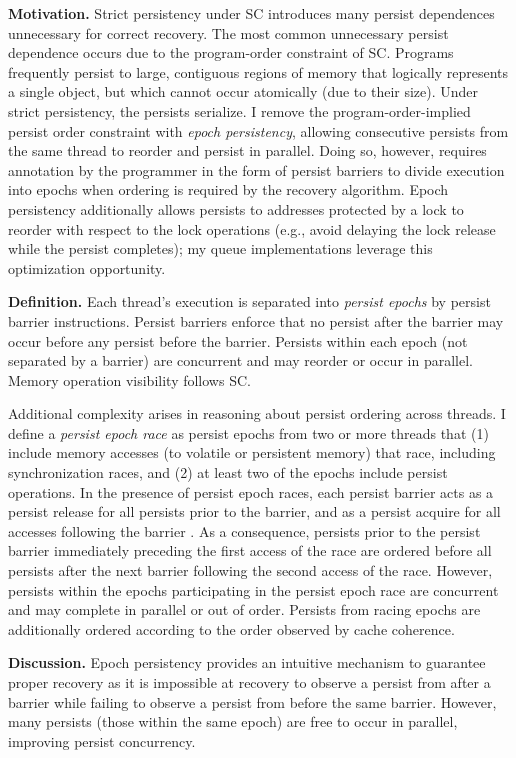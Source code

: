 \textbf{Motivation.}
Strict persistency under SC introduces many persist dependences unnecessary for correct recovery.
The most common unnecessary persist dependence occurs due to the program-order constraint of SC.
Programs frequently persist to large, contiguous regions of memory that logically represents a single object, but which cannot occur atomically (due to their size).
Under strict persistency, the persists serialize.
I remove the program-order-implied persist order constraint with \emph{epoch persistency}, allowing consecutive persists from the same thread to reorder and persist in parallel.
Doing so, however, requires annotation by the programmer in the form of persist barriers to divide execution into epochs when ordering is required by the recovery algorithm.
Epoch persistency additionally allows persists to addresses protected by a lock to reorder with respect to the lock operations (e.g., avoid delaying the lock release while the persist completes); my queue implementations leverage this optimization opportunity.

\textbf{Definition.}
Each thread's execution is separated into \emph{persist epochs} by persist barrier instructions.
Persist barriers enforce that no persist after the barrier may occur before any persist before the barrier.
Persists within each epoch (not separated by a barrier) are concurrent and may reorder or occur in parallel.
Memory operation visibility follows SC.

Additional complexity arises in reasoning about persist ordering across threads. 
I define a \emph{persist epoch race} as persist epochs from two or more threads that (1) include memory accesses (to volatile or persistent memory) that race, including synchronization races, and (2) at least two of the epochs include persist operations. 
In the presence of persist epoch races, each persist barrier acts as a persist release for all persists prior to the barrier, and as a persist acquire for all accesses following the barrier \cite{GharachorlooLenoski90}.
As a consequence, persists prior to the persist barrier immediately preceding the first access of the race are ordered before all persists after the next barrier following the second access of the race.
However, persists within the epochs participating in the persist epoch race are concurrent and may complete in parallel or out of order.
Persists from racing epochs are additionally ordered according to the order observed by cache coherence.

\textbf{Discussion.}
Epoch persistency provides an intuitive mechanism to guarantee proper recovery as it is impossible at recovery to observe a persist from after a barrier while failing to observe a persist from before the same barrier.
However, many persists (those within the same epoch) are free to occur in parallel, improving persist concurrency.

